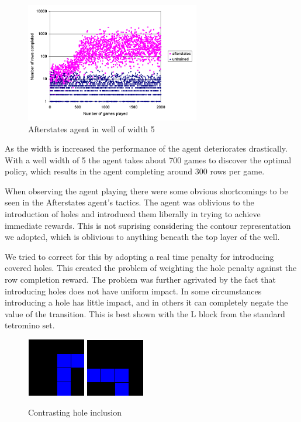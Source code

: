 \documentclass{rucsthesis}
\begin{document}
\begin{figure}[h]
\centering
\includegraphics[width=3in]{afterstatesredtet5well.png}
\caption{Afterstates agent in well of width 5}
\label{fig:afterstatesredtet5well}
\end{figure}

As the width is increased the performance of the agent deteriorates drastically. With a well width of 5 the agent takes about 700 games to discover the optimal policy, which results in the agent completing around 300 rows per game.

When observing the agent playing there were some obvious shortcomings to be seen in the Afterstates agent's tactics. The agent was oblivious to the introduction of holes and introduced them liberally in trying to achieve immediate rewards. This is not suprising considering the contour representation we adopted, which is oblivious to anything beneath the top layer of the well. 

We tried to correct for this by adopting a real time penalty for introducing covered holes. This created the problem of weighting the hole penalty against the row completion reward. The problem was further agrivated by the fact that introducing holes does not have uniform impact. In some circumstances introducing a hole has little impact, and in others it can completely negate the value of the transition. This is best shown with the L block from the standard tetromino set. 

\begin{figure}[h]
\centering
\includegraphics[width=1in]{worthless.png}
\includegraphics[width=1in]{notworthless.png}
\caption{Contrasting hole inclusion}
\label{fig:diffholes}
\end{figure}
\end{document}
